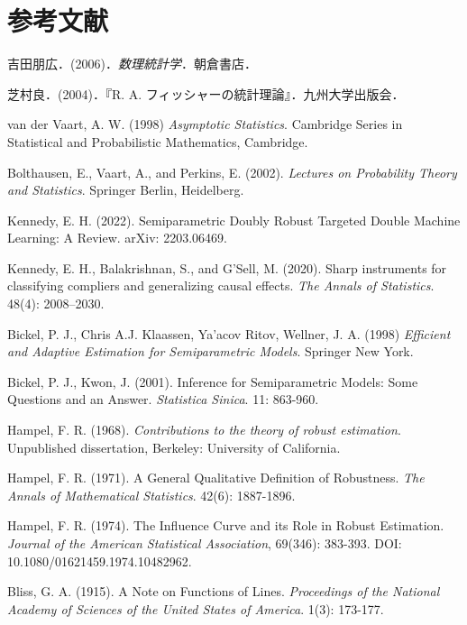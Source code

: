 \documentclass[uplatex,dvipdfmx]{jsreport}
\begin{document}
\chapter{参考文献}


\begin{thebibliography}{99}
    \item
    吉田朋広．(2006)．\textit{数理統計学}．朝倉書店．
    \item
    芝村良．(2004)．『R. A. フィッシャーの統計理論』．九州大学出版会．
    \item
    van der Vaart, A. W. (1998) \textit{Asymptotic Statistics}. Cambridge Series in Statistical and Probabilistic Mathematics, Cambridge.
    \item
    Bolthausen, E., Vaart, A., and Perkins, E. (2002). \textit{Lectures on Probability Theory and Statistics}. Springer Berlin, Heidelberg.
    \item
    Kennedy, E. H. (2022). Semiparametric Doubly Robust Targeted Double Machine Learning: A Review. arXiv: 2203.06469.
    \item
    Kennedy, E. H., Balakrishnan, S., and G’Sell, M. (2020). Sharp instruments for classifying compliers and generalizing causal effects. \textit{The Annals of Statistics}. 48(4): 2008–2030.
    \item 
    Bickel, P. J., Chris A.J. Klaassen, Ya'acov Ritov, Wellner, J. A. (1998) \textit{Efficient and Adaptive Estimation for Semiparametric Models}. Springer New York.
    \item 
    Bickel, P. J., Kwon, J. (2001). Inference for Semiparametric Models: Some Questions and an Answer. \textit{Statistica Sinica}. 11: 863-960.
    \item 
    Hampel, F. R. (1968). \textit{Contributions to the theory of robust estimation}. Unpublished dissertation, Berkeley: University of California.
    \item 
    Hampel, F. R. (1971). A General Qualitative Definition of Robustness. \textit{The Annals of Mathematical Statistics}. 42(6): 1887-1896.
    \item 
    Hampel, F. R. (1974). The Influence Curve and its Role in Robust Estimation. \textit{Journal of the American Statistical Association}, 69(346): 383-393. DOI: 10.1080/01621459.1974.10482962.
    \item
    Bliss, G. A. (1915). A Note on Functions of Lines. \textit{Proceedings of the National Academy of Sciences of the United States of America}. 1(3): 173-177.

\end{thebibliography}
\end{document}
